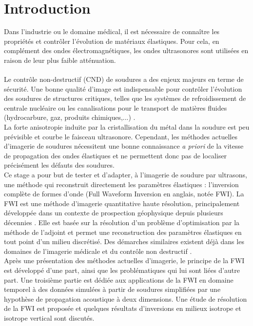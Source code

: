 \chapter*{Introduction}

Dans l'industrie ou le domaine médical, il est nécessaire de connaître les propriétés et contrôler l'évolution de matériaux élastiques. Pour cela, en complément des ondes électromagnétiques,  les ondes ultrasonores sont utilisées en raison de leur plus faible atténuation.\\~\\

Le contrôle non-destructif (CND) de soudures a des enjeux majeurs en terme de sécurité. Une bonne qualité d'image est indispensable pour contrôler l'évolution des soudures de structures critiques, telles que les systèmes de refroidissement de centrale nucléaire ou les canalisations pour le transport de matières fluides (hydrocarbure, gaz, produits chimiques,...) . \\

La forte anisotropie induite par la cristallisation du métal dans la soudure est peu prévisible et courbe le faisceau ultrasonore. Cependant, les méthodes actuelles d'imagerie de soudures nécessitent une bonne connaissance \emph{a priori} de la vitesse de propagation des ondes élastiques et ne permettent donc pas de localiser précisément les défauts des soudures. \\


Ce stage a pour but de tester et d'adapter, à l'imagerie de soudure par ultrasons, une méthode qui reconstruit directement les paramètres élastiques :  l'inversion complète de formes d'onde (Full Waveform Inversion en anglais, notée FWI). La FWI est une méthode d'imagerie quantitative haute résolution, principalement développée dans un contexte de prospection géophysique depuis plusieurs décennies \citep{tarantola_84}. Elle est basée sur la résolution d'un problème d'optimisation par la méthode de l'adjoint et permet une reconstruction des paramètres élastiques en tout point d'un milieu discrétisé. Des démarches similaires existent déjà dans les domaines de l'imagerie médicale \citep{devaney_82} et du contrôle non destructif \citep{dominguez}. \\

Après une présentation des méthodes actuelles d'imagerie, le principe de la FWI est développé d'une part, ainsi que les problématiques qui lui sont liées d'autre part.
Une troisième partie est dédiée aux applications de la FWI en domaine temporel à des données simulées à partir de soudures simplifiées par une hypothèse de propagation acoustique à deux dimensions. Une étude de résolution de la FWI est proposée et quelques résultats d'inversions en milieux isotrope et isotrope vertical sont discutés.









